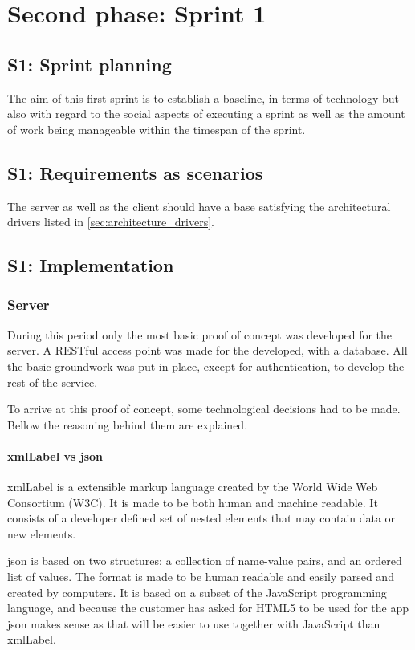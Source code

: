 \documentclass[11pt]{book}
\begin{document}
\section{Second phase: Sprint 1}
\subsection{S1: Sprint planning}
The aim of this first sprint is to establish a baseline, in terms of technology but also with regard to the social aspects of executing a sprint as well as the amount of work being manageable within the timespan of the sprint.

\subsection{S1: Requirements as scenarios}
The server as well as the client should have a base satisfying the architectural drivers listed in \ref{sec:architecture_drivers}.

\subsection{S1: Implementation}

\subsubsection{Server}
During this period only the most basic proof of concept was developed for the server. A RESTful access point was made for the developed, with a database. All the basic groundwork was put in place, except for authentication, to develop the rest of the service.

To arrive at this proof of concept, some technological decisions had to be made. Bellow the reasoning behind them are explained.

\paragraph{\gls{xmlLabel} vs \gls{json}}
\gls{xmlLabel} is a extensible markup language created by the World Wide Web Consortium (W3C). It is made to be both human and machine readable. It consists of a developer defined set of nested elements that may contain data or new elements.

\gls{json} \cite{json} is based on two structures: a collection of name-value pairs, and an ordered list of values. The format is made to be human readable and easily parsed and created by computers. It is based on a subset of the JavaScript programming language, and because the customer has asked for HTML5 to be used for the app \gls{json} makes sense as that will be easier to use together with JavaScript than \gls{xmlLabel}.
\end{document}
